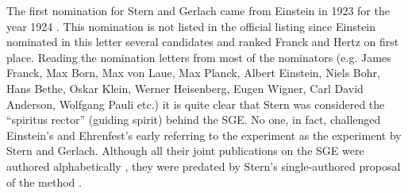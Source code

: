 \documentclass[12pt]{article}
\begin{document}
The first nomination for Stern and Gerlach came from Einstein in 1923 for the year 1924 \cite[Doc.~132]{CPAE14}. This nomination is not listed in the official listing since Einstein nominated in this letter several candidates and ranked Franck and Hertz on first place. Reading the nomination letters from most of the nominators (e.g. James Franck, Max Born, Max von Laue, Max Planck, Albert Einstein, Niels Bohr, Hans Bethe, Oskar Klein, Werner Heisenberg, Eugen Wigner, Carl David Anderson, Wolfgang Pauli etc.) it is quite clear that Stern was considered the ``spiritus rector'' (guiding spirit) behind the SGE. No one, in fact, challenged Einstein's and Ehrenfest's early referring to the experiment as the experiment by Stern and Gerlach. Although all their joint publications on the SGE were authored alphabetically \citep{GerlachWEtal1921Nachweis,GerlachWEtal1922Moment,GerlachWEtal1922Nachweis,GerlachWEtal1924Richtungsquantelung}, they were predated by Stern's single-authored proposal of the method \citep{SternO1921Weg}.
\end{document}

